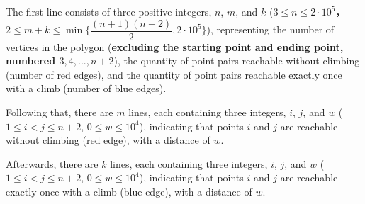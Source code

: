 The first line consists of three positive integers, $n$, $m$, and $k$ ($3 \le n \le 2 \cdot 10^5$，$2 \le m + k \le \min\{\dfrac{(n + 1)(n + 2)}{2}, 2 \cdot 10^5\}$), representing the number of vertices in the polygon (\textbf{excluding the starting point and ending point, numbered $3, 4, ..., n + 2$}), the quantity of point pairs reachable without climbing (number of red edges), and the quantity of point pairs reachable exactly once with a climb (number of blue edges).

Following that, there are $m$ lines, each containing three integers, $i$, $j$, and $w$ ($1 \le i < j \le n + 2$, $0 \le w \le 10^4$), indicating that points $i$ and $j$ are reachable without climbing (red edge), with a distance of $w$.

Afterwards, there are $k$ lines, each containing three integers, $i$, $j$, and $w$ ($1 \le i < j \le n + 2$, $0 \le w \le 10^4$), indicating that points $i$ and $j$ are reachable exactly once with a climb (blue edge), with a distance of $w$.